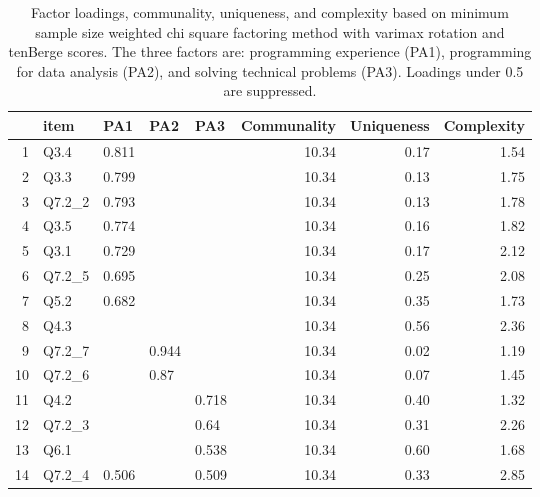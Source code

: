 \documentclass[020-persona\_validation.tex]{subfiles}
\begin{document}
        \begin{table}[ht]
            \centering
            \caption[3-factor item loadings]
            {Factor loadings, communality, uniqueness, and complexity
                based on minimum sample size weighted chi square factoring method with varimax rotation and tenBerge scores.
                The three factors are:
                programming experience (PA1),
                programming for data analysis (PA2), and
                solving technical problems (PA3).
                Loadings under 0.5 are suppressed.
            }
            \begin{tabular}{rllllrrr}
                \hline
               & item & PA1 & PA2 & PA3 & Communality & Uniqueness & Complexity \\
                \hline
              1 & Q3.4 & 0.811 &  &  & 10.34 & 0.17 & 1.54 \\
                2 & Q3.3 & 0.799 &  &  & 10.34 & 0.13 & 1.75 \\
                3 & Q7.2\_2 & 0.793 &  &  & 10.34 & 0.13 & 1.78 \\
                4 & Q3.5 & 0.774 &  &  & 10.34 & 0.16 & 1.82 \\
                5 & Q3.1 & 0.729 &  &  & 10.34 & 0.17 & 2.12 \\
                6 & Q7.2\_5 & 0.695 &  &  & 10.34 & 0.25 & 2.08 \\
                7 & Q5.2 & 0.682 &  &  & 10.34 & 0.35 & 1.73 \\
                8 & Q4.3 &  &  &  & 10.34 & 0.56 & 2.36 \\
                9 & Q7.2\_7 &  & 0.944 &  & 10.34 & 0.02 & 1.19 \\
                10 & Q7.2\_6 &  & 0.87 &  & 10.34 & 0.07 & 1.45 \\
                11 & Q4.2 &  &  & 0.718 & 10.34 & 0.40 & 1.32 \\
                12 & Q7.2\_3 &  &  & 0.64 & 10.34 & 0.31 & 2.26 \\
                13 & Q6.1 &  &  & 0.538 & 10.34 & 0.60 & 1.68 \\
                14 & Q7.2\_4 & 0.506 &  & 0.509 & 10.34 & 0.33 & 2.85 \\
                 \hline
              \end{tabular}
            \label{tab:fa-3}
        \end{table}
\end{document}
